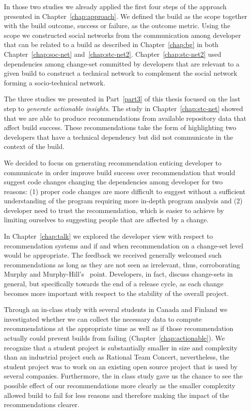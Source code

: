In those two studies we already applied the first four steps of the approach presented in Chapter~\ref{chap:approach}.
We defined the build as the scope together with the build outcome, success or failure, as the outcome metric.
Using the scope we constructed social networks from the communication among developer that can be related to a build as described in Chapter~\ref{chap:bg} in both Chapter~\ref{chap:soc-net} and~\ref{chap:stc-net2}.
Chapter~\ref{chap:stc-net2} used dependencies among change-set committed by developers that are relevant to a given build to construct a technical network to complement the social network forming a socio-technical network.

The three studies we presented in Part~\ref{part3} of this thesis focused on the last step to \emph{generate actionable insights}.
The study in Chapter~\ref{chap:stc-net} showed that we are able to produce recommendations from available repository data that affect build success.
These recommendations take the form of highlighting two developers that have a technical dependency but did not communicate in the context of the build.

We decided to focus on generating recommendation enticing developer to communicate in order improve build success over recommendation that would suggest code changes changing the dependencies among developer for two reasons:
(1) proper code changes are more difficult to suggest without a sufficient understanding of the program requiring more in-depth program analysis and 
(2) developer need to trust the recommendation, which is easier to achieve by limiting ourselves to suggesting people that are affected by a change.

In Chapter~\ref{chap:talk} we explored the developer view with respect to recommendation systems and if and when recommendation on a change-set level would be appropriate.
The feedback we received generally welcomed such recommendations as long as they are not seen as irrelevant, thus, corroborating Murphy and Murphy-Hill's~\cite{murphy:rsse:2010} point.
Developers, in fact, discuss change-sets in general, but specifically towards the end of a release cycle, as each change becomes more important with respect to the stability of the overall project.

Through an in-class study with several students in Canada and Finland we investigated whether we can collect the necessary data to compute recommendations at the appropriate time as well as if those recommendation actually could prevent builds from failing (Chapter~\ref{chap:actionable}).
We recognize that a student project is substantially smaller in size and complexity than an industrial project such as Rational Team Concert, nevertheless, the student project was to work on an existing open source project that is used by several companies.
Furthermore, the in class study gave us the chance to see the possible effect of our recommendations more clearly as the smaller complexity allowed build to fail for less reasons and therefore making the impact of the recommendations clearer.

